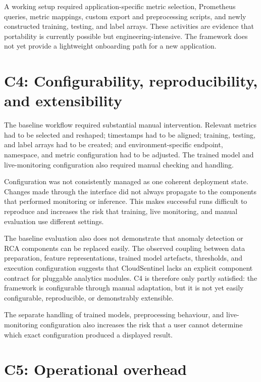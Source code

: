 A working setup required application-specific metric selection, Prometheus queries, metric mappings, custom export and preprocessing scripts, and newly constructed training, testing, and label arrays. These activities are evidence that portability is currently possible but engineering-intensive. The framework does not yet provide a lightweight onboarding path for a new application.


\section{C4: Configurability, reproducibility, and extensibility}
The baseline workflow required substantial manual intervention. Relevant metrics had to be selected and reshaped; timestamps had to be aligned; training, testing, and label arrays had to be created; and environment-specific endpoint, namespace, and metric configuration had to be adjusted. The trained model and live-monitoring configuration also required manual checking and handling.

Configuration was not consistently managed as one coherent deployment state. Changes made through the interface did not always propagate to the components that performed monitoring or inference. This makes successful runs difficult to reproduce and increases the risk that training, live monitoring, and manual evaluation use different settings.

The baseline evaluation also does not demonstrate that anomaly detection or RCA components can be replaced easily. The observed coupling between data preparation, feature representations, trained model artefacts, thresholds, and execution configuration suggests that CloudSentinel lacks an explicit component contract for pluggable analytics modules. C4 is therefore only partly satisfied: the framework is configurable through manual adaptation, but it is not yet easily configurable, reproducible, or demonstrably extensible.

The separate handling of trained models, preprocessing behaviour, and live-monitoring configuration also increases the risk that a user cannot determine which exact configuration produced a displayed result.

\section{C5: Operational overhead}


